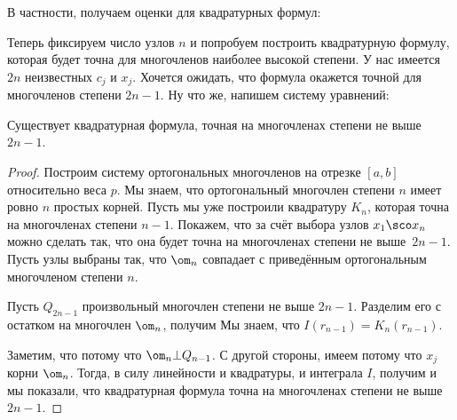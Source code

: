 \documentclass[a4paper]{article}
\begin{document}
В частности, получаем оценки для квадратурных формул:

Теперь фиксируем число узлов $n$ и попробуем построить квадратурную
формулу, которая будет точна для многочленов наиболее высокой
степени. У нас имеется $2n$ неизвестных $c_j$ и $x_j$.  Хочется
ожидать, что формула окажется точной для многочленов степени $2n-1$.
Ну что же, напишем систему уравнений: 

\begin{stm}
Существует квадратурная формула, точная на многочленах степени не выше
$2n-1$.
\end{stm}
\begin{proof}
Построим систему ортогональных многочленов на отрезке $[a,b]$
относительно веса $p$.  Мы знаем, что ортогональный многочлен степени
$n$ имеет ровно $n$ простых корней.  Пусть мы уже построили квадратуру
$K_n$, которая точна на многочленах степени $n-1$.  Покажем, что за
счёт выбора узлов $x_1\sco x_n$ можно сделать так, что она будет точна
на многочленах степени не выше~${2n-1}$.  Пусть узлы выбраны так, что
$\om_n$ совпадает с приведённым ортогональным многочленом степени $n$.

Пусть $Q_{2n-1}$ произвольный многочлен степени не выше $2n-1$.
Разделим его с остатком на многочлен $\om_n$, получим   Мы знаем, что $I(r_{n-1}) =
K_n(r_{n-1})$.

Заметим, что  потому что $\om_n \bot Q_{n-1}$.  С другой стороны, имеем
 потому
что $x_j$ корни $\om_n$. Тогда, в силу линейности и квадратуры, и
интеграла $I$, получим  и мы показали, что квадратурная формула точна на
многочленах степени не выше $2n-1$.
\end{proof}
\end{document}
